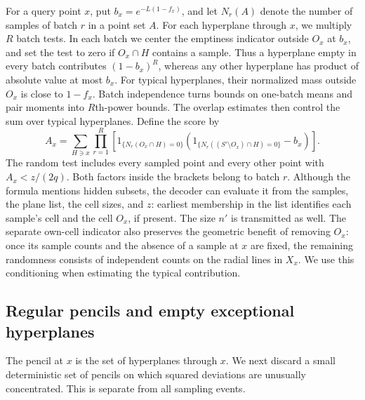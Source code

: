 For a query point $x$, put $b_x=e^{-L(1-f_x)}$, and let $N_r(A)$
denote the number of samples of batch $r$ in a point set $A$.
For each hyperplane through $x$, we multiply $R$ batch tests.
In each batch we center the emptiness indicator outside $O_x$ at $b_x$,
and set the test to zero if $O_x\cap H$ contains a sample. Thus a
hyperplane empty in every batch contributes $(1-b_x)^R$, whereas
any other hyperplane has product of absolute value at most $b_x$.
For typical hyperplanes, their normalized mass outside $O_x$ is close
to $1-f_x$.
Batch independence turns bounds on one-batch means and pair moments
into $R$th-power bounds. The overlap estimates then control the sum
over typical hyperplanes.
Define the score by
\begin{equation}\label{learn:score}
 A_x=\sum_{H\ni x}\prod_{r=1}^R
 \left[
 1_{\{N_r(O_x\cap H)=0\}}
 \left(1_{\{N_r((S'\setminus O_x)\cap H)=0\}}-b_x\right)
 \right].
\end{equation}
The random test includes every sampled point and every other point
with $A_x<z/(2q)$. Both factors inside the brackets belong to batch
$r$. Although the formula mentions hidden subsets, the decoder can
evaluate it from the samples, the plane list, the cell sizes, and $z$:
earliest membership in the list identifies each sample's cell and the
cell $O_x$, if present. The size $n'$ is transmitted as well.
The separate own-cell indicator also preserves the geometric benefit
of removing $O_x$: once its sample counts and the absence of a sample
at $x$ are fixed, the remaining randomness consists of independent
counts on the radial lines in $X_x$. We use this conditioning when
estimating the typical contribution.

\subsection{Regular pencils and empty exceptional hyperplanes}

The pencil at $x$ is the set of hyperplanes through $x$. We next discard
a small deterministic set of pencils on which squared deviations are
unusually concentrated. This is separate from all sampling events.

